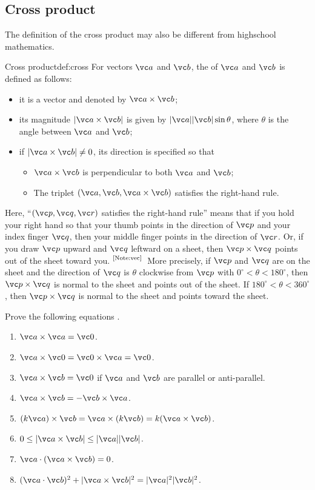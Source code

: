 \documentclass[11pt,pdfa,lastpage]{MishoNote}
\begin{document}
\subsection{Cross product}\label{sec:cross}
The definition of the cross product may also be different from highschool mathematics.
\begin{definition}{Cross product}{def:cross}
  For vectors $\vc a$ and $\vc b$, the  of $\vc a$ and $\vc b$ is defined as follows:
\begin{itemize}
  \item it is a vector and denoted by $\vc a\times\vc b$;
  \item its magnitude $|\vc a\times\vc b|$ is given by $|\vc a||\vc b|\sin\theta$, where $\theta$ is the angle between $\vc a$ and $\vc b$;
  \item if $|\vc a\times\vc b|\neq 0$, its direction is specified so that
  \begin{itemize}
    \item $\vc a\times\vc b$ is perpendicular to both $\vc a$ and $\vc b$;
    \item The triplet $(\vc a,\vc b,\vc a\times\vc b)$ satisfies the right-hand rule.
  \end{itemize}
\end{itemize}
\end{definition}
Here, ``$(\vc p,\vc q,\vc r) $ satisfies the right-hand rule'' means that if you hold your right hand so that your thumb points in the direction of $\vc p$ and your index finger $\vc q$, then your middle finger points in the direction of $\vc r$. Or, if you draw $\vc p$ upward and $\vc q$ leftward on a sheet, then $\vc p\times\vc q$ points out of the sheet toward you.%
\mbox{$^{\text{\ref{Note:vec}}}$}\
\NoteBox[label=Note:vec]
 More precisely, if $\vc p$ and $\vc q$ are on the sheet and the direction of $\vc q$ is $\theta$ clockwise from $\vc p$ with $0^\circ<\theta<180^\circ$, then $\vc p\times\vc q$ is normal to the sheet and points out of the sheet. If $180^\circ<\theta<360^\circ$, then $\vc p\times \vc q$ is normal to the sheet and points toward the sheet.
\endNoteBox
\begin{problems}
  \Problem[A] Prove the following equations .
  \begin{enumerate}
    \item $\vc a\times\vc a=\vc 0$.
    \item $\vc a\times\vc 0=\vc 0\times\vc a=\vc 0$.
    \item $\vc a\times\vc b=\vc 0$ if $\vc a$ and $\vc b$ are parallel or anti-parallel.
    \item $\vc a\times\vc b=-\vc b\times\vc a$.
    \item $(k\vc a)\times\vc b=\vc a\times(k\vc b)=k(\vc a\times\vc b)$.
    \item $0\le|\vc a\times\vc b|\le|\vc a||\vc b|$.
    \item $\vc a\cdot(\vc a\times\vc b)=0$.
    \item $(\vc a\cdot\vc b)^2+|\vc a\times\vc b|^2=|\vc a|^2|\vc b|^2$.
  \end{enumerate}
\end{problems}
\end{document}
